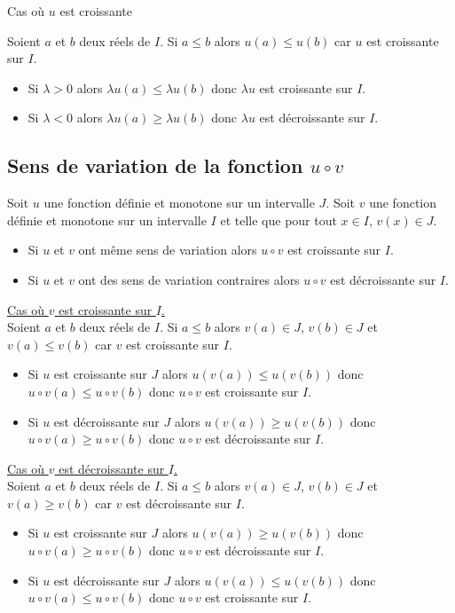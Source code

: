 \documentclass[french]{book}
\newcommand{\se}{\geq}
\newcommand{\ie}{\leq}
\begin{document}
\begin{demo}
Cas où $u$ est croissante

Soient $a$ et $b$ deux réels de $I$.
Si $a \ie b$ alors $u(a) \ie u(b)$ car $u$ est croissante sur $I$.
\begin{itemize}
\item Si $\lambda >0$ alors $\lambda u(a) \ie \lambda u(b)$ donc $\lambda u$ est croissante sur $I$.
\item Si $\lambda <0$ alors $\lambda u(a) \se \lambda u(b)$ donc $\lambda u$ est décroissante sur $I$.
\end{itemize}
\end{demo}
%
\subsection{Sens de variation de la fonction $u\circ v$}
\begin{prop}
Soit $u$ une fonction définie et monotone sur un intervalle $J$. Soit $v$ une fonction définie et monotone sur un intervalle $I$ et telle que pour tout $x\in I$, $v(x)\in J$.
\begin{itemize}
\item Si $u$ et $v$ ont même sens de variation alors $u\circ v$ est croissante sur $I$.
\item Si $u$ et $v$ ont des sens de variation contraires alors $u\circ v$ est décroissante sur $I$.
\end{itemize}
\end{prop}

\begin{demo}
\underline{Cas où $v$ est croissante sur $I$.}\\

Soient $a$ et $b$ deux réels de $I$.
Si $a \ie b$ alors $v(a) \in J$, $v(b) \in J$ et $v(a) \ie v(b)$ car $v$ est croissante sur $I$.
\begin{itemize}
\item Si $u$ est croissante sur $J$ alors $u(v(a)) \ie u(v(b))$ donc $u\circ v(a) \ie u\circ v(b)$ donc $u\circ v$ est croissante sur $I$.
\item Si $u$ est décroissante sur $J$ alors $u(v(a)) \se u(v(b))$ donc $u\circ v(a) \se u\circ v(b)$ donc $u\circ v$ est décroissante sur $I$.
\end{itemize}

\underline{Cas où $v$ est décroissante sur $I$.} \\

Soient $a$ et $b$ deux réels de $I$.
Si $a \ie b$ alors $v(a) \in J$, $v(b) \in J$ et $v(a) \se v(b)$ car $v$ est décroissante sur $I$.
\begin{itemize}
\item Si $u$ est croissante sur $J$ alors $u(v(a)) \se u(v(b))$ donc $u\circ v(a) \se u\circ v(b)$ donc $u\circ v$ est décroissante sur $I$.
\item Si $u$ est décroissante sur $J$ alors $u(v(a)) \ie u(v(b))$ donc $u\circ v(a) \ie u\circ v(b)$ donc $u\circ v$ est croissante sur $I$.
\end{itemize}

\end{demo}
\newpage
\end{document}
